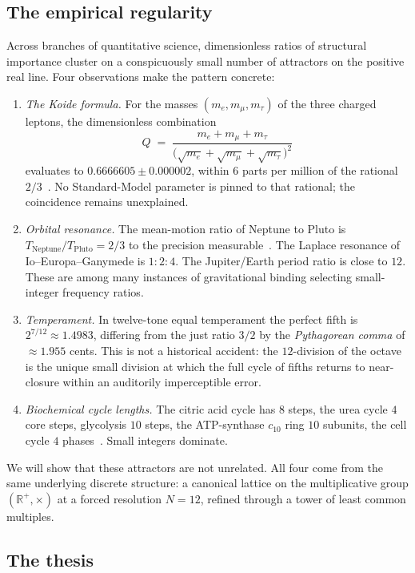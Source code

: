 \documentclass[11pt,a4paper]{article}
\theoremstyle{definition}
\theoremstyle{remark}
\newcommand{\R}{\mathbb{R}}
\begin{document}
\subsection{The empirical regularity}

Across branches of quantitative science, dimensionless ratios of structural importance cluster on a conspicuously small number of attractors on the positive real line. Four observations make the pattern concrete:

\begin{enumerate}[leftmargin=*]
\item \emph{The Koide formula.} For the masses $(m_e,m_{\mu},m_{\tau})$ of the three charged leptons, the dimensionless combination
\[
Q \;=\; \frac{m_e+m_{\mu}+m_{\tau}}{\bigl(\sqrt{m_e}+\sqrt{m_{\mu}}+\sqrt{m_{\tau}}\bigr)^{2}}
\]
evaluates to $0.6666605\pm 0.000002$, within $6$ parts per million of the rational $2/3$~\cite{Koide1982}. No Standard-Model parameter is pinned to that rational; the coincidence remains unexplained.
\item \emph{Orbital resonance.} The mean-motion ratio of Neptune to Pluto is $T_{\mathrm{Neptune}}/T_{\mathrm{Pluto}}=2/3$ to the precision measurable~\cite{CohenHubbard1965}. The Laplace resonance of Io--Europa--Ganymede is $1{:}2{:}4$. The Jupiter/Earth period ratio is close to $12$. These are among many instances of gravitational binding selecting small-integer frequency ratios.
\item \emph{Temperament.} In twelve-tone equal temperament the perfect fifth is $2^{7/12}\approx 1.4983$, differing from the just ratio $3/2$ by the \emph{Pythagorean comma} of $\approx 1.955$ cents. This is not a historical accident: the $12$-division of the octave is the unique small division at which the full cycle of fifths returns to near-closure within an auditorily imperceptible error.
\item \emph{Biochemical cycle lengths.} The citric acid cycle has $8$ steps, the urea cycle $4$ core steps, glycolysis $10$ steps, the ATP-synthase $c_{10}$ ring $10$ subunits, the cell cycle $4$ phases~\cite{Alberts}. Small integers dominate.
\end{enumerate}

We will show that these attractors are not unrelated. All four come from the same underlying discrete structure: a canonical lattice on the multiplicative group $(\R^{+},\times)$ at a forced resolution $N=12$, refined through a tower of least common multiples.

\subsection{The thesis}
\end{document}
